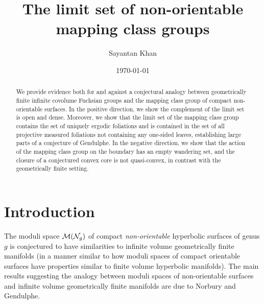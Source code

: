 \documentclass[12pt, reqno]{amsart}
\title{The limit set of non-orientable mapping class groups}
\author{Sayantan Khan}
\date{\today}
\begin{document}
\begin{abstract}
  We provide evidence both for and against a conjectural analogy between geometrically finite infinite covolume Fuchsian groups and the mapping class group of compact non-orientable surfaces.
  In the positive direction, we show the complement of the limit set is open and dense. 
  Moreover, we show that the limit set of the mapping class group contains the set of uniquely ergodic foliations and is contained in the set of all projective measured foliations not containing any one-sided leaves, establishing large parts of a conjecture of Gendulphe.
  In the negative direction, we show that the action of the mapping class group on the boundary has an empty wandering set, and the closure of a conjectured convex core is not quasi-convex, in contrast with the geometrically finite setting.
%
\end{abstract}
\maketitle


\section{Introduction}
\label{sec:introduction-v2}

The moduli space $\mathcal{M}(\mathcal{N}_g)$ of compact \emph{non-orientable} hyperbolic surfaces of genus $g$ is conjectured to have similarities to infinite volume geometrically finite manifolds (in a manner similar to how moduli spaces of compact orientable surfaces have properties similar to finite volume hyperbolic manifolds).
The main results suggesting the analogy between moduli spaces of non-orientable surfaces and infinite volume geometrically finite manifolds are due to Norbury and Gendulphe.
\end{document}
